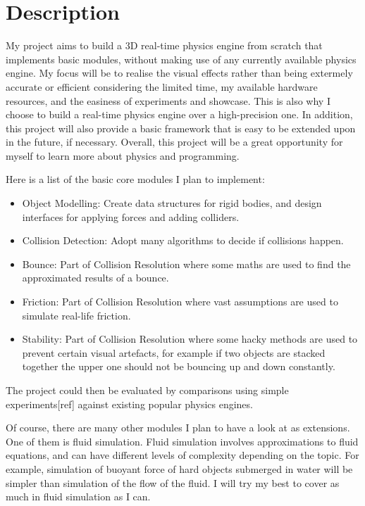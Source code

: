 \documentclass[12pt]{report}
\begin{document}
\section{Description}

My project aims to build a 3D real-time physics engine from scratch that implements basic modules, 
without making use of any currently available physics engine.
My focus will be to realise the visual effects rather than being extermely accurate or efficient considering
the limited time, my available hardware resources, and the easiness of experiments and showcase.
This is also why I choose to build a real-time physics engine over a high-precision one.
In addition, this project will also provide a basic framework that is easy to be extended upon in the future, if necessary.
Overall, this project will be a great opportunity for myself to learn more about physics and programming.

Here is a list of the basic core modules I plan to implement:
\begin{itemize}
\item Object Modelling: Create data structures for rigid bodies, and design interfaces for applying forces and adding colliders.
\item Collision Detection: Adopt many algorithms to decide if collisions happen.
\item Bounce: Part of Collision Resolution where some maths are used to find the approximated results of a bounce.
\item Friction: Part of Collision Resolution where vast assumptions are used to simulate real-life friction.
\item Stability: Part of Collision Resolution where some hacky methods are used to prevent certain visual artefacts, 
for example if two objects are stacked together the upper one should not be bouncing up and down constantly.
\end{itemize}

The project could then be evaluated by comparisons using simple experiments[ref] against existing popular physics engines.

Of course, there are many other modules I plan to have a look at as extensions.
One of them is fluid simulation.
Fluid simulation involves approximations to fluid equations, 
and can have different levels of complexity depending on the topic.
For example, 
simulation of buoyant force of hard objects submerged in water will be simpler than simulation of the flow of the fluid.
I will try my best to cover as much in fluid simulation as I can.
\end{document}
